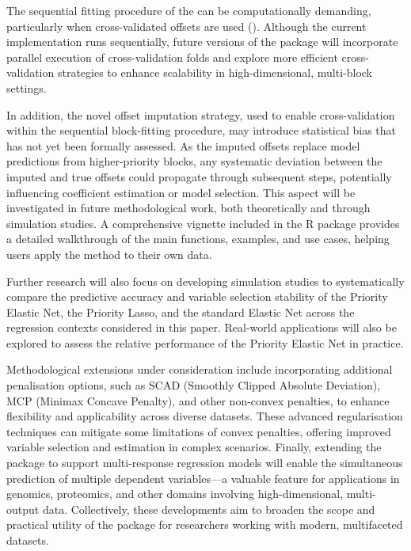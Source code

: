 The sequential fitting procedure of the  can be computationally demanding, particularly when cross-validated offsets are used (). Although the current implementation runs sequentially, future versions of the  package will incorporate parallel execution of cross-validation folds and explore more efficient cross-validation strategies to enhance scalability in high-dimensional, multi-block settings.

In addition, the novel offset imputation strategy, used to enable cross-validation within the sequential block-fitting procedure, may introduce statistical bias that has not yet been formally assessed. As the imputed offsets replace model predictions from higher-priority blocks, any systematic deviation between the imputed and true offsets could propagate through subsequent steps, potentially influencing coefficient estimation or model selection. This aspect will be investigated in future methodological work, both theoretically and through simulation studies. A comprehensive vignette included in the R package provides a detailed walkthrough of the main functions, examples, and use cases, helping users apply the method to their own data.

Further research will also focus on developing simulation studies to systematically compare the predictive accuracy and variable selection stability of the Priority Elastic Net, the Priority Lasso, and the standard Elastic Net across the regression contexts considered in this paper. Real-world applications will also be explored to assess the relative performance of the Priority Elastic Net in practice.

Methodological extensions under consideration include incorporating additional penalisation options, such as SCAD (Smoothly Clipped Absolute Deviation), MCP (Minimax Concave Penalty), and other non-convex penalties, to enhance flexibility and applicability across diverse datasets. These advanced regularisation techniques can mitigate some limitations of convex penalties, offering improved variable selection and estimation in complex scenarios. Finally, extending the package to support multi-response regression models will enable the simultaneous prediction of multiple dependent variables—a valuable feature for applications in genomics, proteomics, and other domains involving high-dimensional, multi-output data. Collectively, these developments aim to broaden the scope and practical utility of the package for researchers working with modern, multifaceted datasets.

